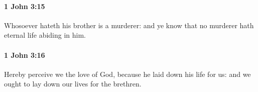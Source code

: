 		\paragraph{1 John 3:15} %
			\label{1JOHN-3-15}

			Whosoever hateth his brother is a murderer: and ye know that no murderer hath eternal life abiding in him.

			\begin{framed}
			\scriptsize
				\begin{compactdesc}
					\item[SBLG] 
				\end{compactdesc}
			\end{framed}

		\paragraph{1 John 3:16} %
			\label{1JOHN-3-16}

			Hereby perceive we the love of God, because he laid down his life for us: and we ought to lay down our lives for the brethren.

